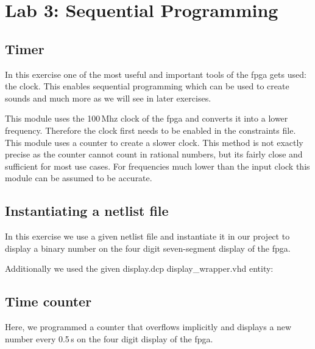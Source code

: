 \chapter{Lab 3: Sequential Programming} \label{day3}



\section{Timer}

In this exercise one of the most useful and important tools of the \gls{fpga} gets used: the clock. This enables sequential programming which can be used to create sounds and much more as we will see in later exercises.

This module uses the 100\,Mhz clock of the \gls{fpga} and converts it into a lower frequency. Therefore the clock first needs to be enabled in the constraints file. This module uses a counter to create a slower clock. This method is not exactly precise as the counter cannot count in rational numbers, but its fairly close and sufficient for most use cases. For frequencies much lower than the input clock this module can be assumed to be accurate.





\section{Instantiating a netlist file}

In this exercise we use a given netlist file and instantiate it in our project to display a binary number on the four digit seven-segment display of the \gls{fpga}. 



Additionally we used the given display.dcp display\_wrapper.vhd entity:



\section{Time counter}

Here, we programmed a counter that overflows implicitly and displays a new number every 0.5\,s on the four digit display of the \gls{fpga}. 

